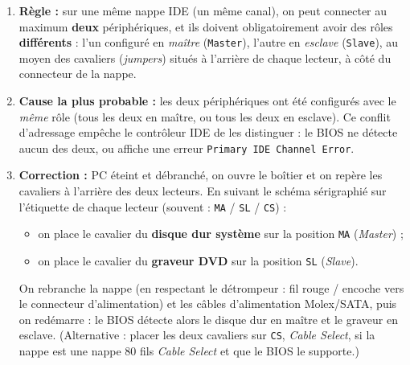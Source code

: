 \documentclass[11pt]{article}
\begin{document}
\begin{corrige}
\begin{enumerate}
  \item \textbf{Règle :} sur une même nappe IDE (un même canal), on peut connecter au maximum \textbf{deux} périphériques, et ils doivent obligatoirement avoir des rôles \textbf{différents} : l'un configuré en \emph{maître} (\texttt{Master}), l'autre en \emph{esclave} (\texttt{Slave}), au moyen des cavaliers (\emph{jumpers}) situés à l'arrière de chaque lecteur, à côté du connecteur de la nappe.
  \item \textbf{Cause la plus probable :} les deux périphériques ont été configurés avec le \emph{même} rôle (tous les deux en maître, ou tous les deux en esclave). Ce conflit d'adressage empêche le contrôleur IDE de les distinguer : le BIOS ne détecte aucun des deux, ou affiche une erreur \texttt{Primary IDE Channel Error}.
  \item \textbf{Correction :} PC éteint et débranché, on ouvre le boîtier et on repère les cavaliers à l'arrière des deux lecteurs. En suivant le schéma sérigraphié sur l'étiquette de chaque lecteur (souvent : \texttt{MA} / \texttt{SL} / \texttt{CS}) :
  \begin{itemize}
    \item on place le cavalier du \textbf{disque dur système} sur la position \texttt{MA} (\emph{Master}) ;
    \item on place le cavalier du \textbf{graveur DVD} sur la position \texttt{SL} (\emph{Slave}).
  \end{itemize}
  On rebranche la nappe (en respectant le détrompeur : fil rouge / encoche vers le connecteur d'alimentation) et les câbles d'alimentation Molex/SATA, puis on redémarre : le BIOS détecte alors le disque dur en maître et le graveur en esclave. (Alternative : placer les deux cavaliers sur \texttt{CS}, \emph{Cable Select}, si la nappe est une nappe 80 fils \emph{Cable Select} et que le BIOS le supporte.)
\end{enumerate}
\end{corrige}
\end{document}

